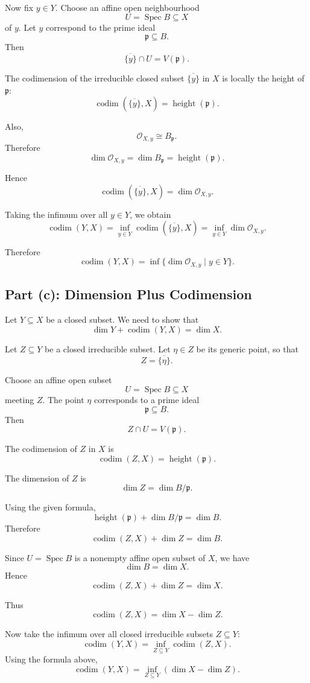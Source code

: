 \documentclass[12pt,a4paper]{article}
\DeclareMathOperator{\Spec}{Spec}
\newcommand{\codim}{\operatorname{codim}}
\providecommand{\Spec}{\operatorname{Spec}}
\theoremstyle{notespace}
\begin{document}
Now fix \(y\in Y\). Choose an affine open neighbourhood
\[
U=\Spec B\subseteq X
\]
of \(y\). Let \(y\) correspond to the prime ideal
\[
\mathfrak p\subseteq B.
\]
Then
\[
\overline{\{y\}}\cap U=V(\mathfrak p).
\]

The codimension of the irreducible closed subset \(\overline{\{y\}}\) in \(X\) is locally the height of \(\mathfrak p\):
\[
\codim(\overline{\{y\}},X)
=
\operatorname{height}(\mathfrak p).
\]

Also,
\[
\mathcal O_{X,y}\cong B_{\mathfrak p}.
\]
Therefore
\[
\dim \mathcal O_{X,y}
=
\dim B_{\mathfrak p}
=
\operatorname{height}(\mathfrak p).
\]

Hence
\[
\codim(\overline{\{y\}},X)=\dim \mathcal O_{X,y}.
\]

Taking the infimum over all \(y\in Y\), we obtain
\[
\codim(Y,X)
=
\inf_{y\in Y}\codim(\overline{\{y\}},X)
=
\inf_{y\in Y}\dim \mathcal O_{X,y}.
\]

Therefore
\[
\boxed{
	\codim(Y,X)
	=
	\inf\{\dim \mathcal O_{X,y}\mid y\in Y\}.
}
\]

\subsection{Part (c): Dimension Plus Codimension}

Let \(Y\subseteq X\) be a closed subset. We need to show that
\[
\dim Y+\codim(Y,X)=\dim X.
\]

Let \(Z\subseteq Y\) be a closed irreducible subset. Let \(\eta\in Z\) be its generic point, so that
\[
Z=\overline{\{\eta\}}.
\]

Choose an affine open subset
\[
U=\Spec B\subseteq X
\]
meeting \(Z\). The point \(\eta\) corresponds to a prime ideal
\[
\mathfrak p\subseteq B.
\]
Then
\[
Z\cap U=V(\mathfrak p).
\]

The codimension of \(Z\) in \(X\) is
\[
\codim(Z,X)=\operatorname{height}(\mathfrak p).
\]

The dimension of \(Z\) is
\[
\dim Z=\dim B/\mathfrak p.
\]

Using the given formula,
\[
\operatorname{height}(\mathfrak p)+\dim B/\mathfrak p=\dim B.
\]
Therefore
\[
\codim(Z,X)+\dim Z=\dim B.
\]

Since \(U=\Spec B\) is a nonempty affine open subset of \(X\), we have
\[
\dim B=\dim X.
\]
Hence
\[
\codim(Z,X)+\dim Z=\dim X.
\]

Thus
\[
\codim(Z,X)=\dim X-\dim Z.
\]

Now take the infimum over all closed irreducible subsets \(Z\subseteq Y\):
\[
\codim(Y,X)
=
\inf_{Z\subseteq Y}\codim(Z,X).
\]
Using the formula above,
\[
\codim(Y,X)
=
\inf_{Z\subseteq Y}(\dim X-\dim Z).
\]
\end{document}
